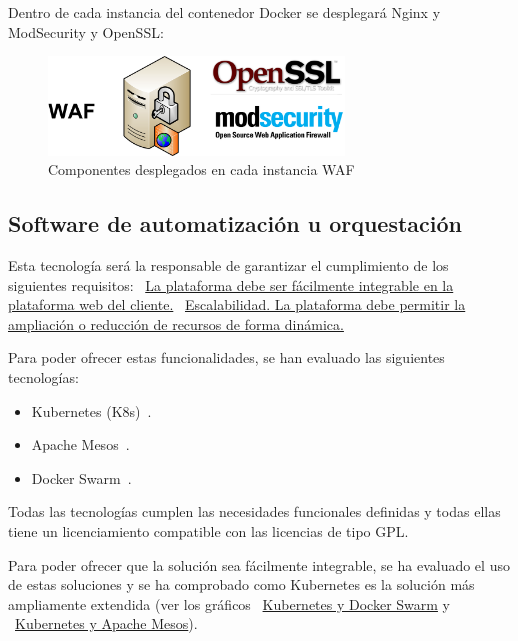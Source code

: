 \par Dentro de cada instancia del contenedor Docker se desplegará Nginx y ModSecurity y OpenSSL:
\begin{figure}[!h]
  \centering
  \label{fig:Diagram_WAF_TLS}
  \includegraphics[width=0.7\textwidth]{fig/Diagram_WAF_TLS}
  \caption{Componentes desplegados en cada instancia WAF}
\end{figure}

\subsection{Software de automatización u orquestación}
\par Esta tecnología será la responsable de garantizar el cumplimiento de los siguientes requisitos:
{~\hyperref[req:facilidad]{La plataforma debe ser fácilmente integrable en la plataforma web del cliente.}}
{~\hyperref[req:escalado]{Escalabilidad. La plataforma debe permitir la ampliación o reducción de recursos de forma dinámica.}}

\par Para poder ofrecer estas funcionalidades, se han evaluado las siguientes tecnologías:
\begin{itemize}
  \item Kubernetes (K8s)~\cite{kubernetes}.
  \item Apache Mesos~\cite{mesos}.
  \item Docker Swarm~\cite{swarm}.
\end{itemize}

\par Todas las tecnologías cumplen las necesidades funcionales definidas y todas ellas tiene un licenciamiento compatible con las licencias de tipo GPL.

\par Para poder ofrecer que la solución sea fácilmente integrable, se ha evaluado el uso de estas soluciones y se ha comprobado como Kubernetes es la solución más ampliamente extendida (ver los gráficos
{~\hyperref[fig:KubernetesSwarm]{Kubernetes y Docker Swarm}} y {~\hyperref[fig:KubernetesMesos]{Kubernetes y Apache Mesos}}).

